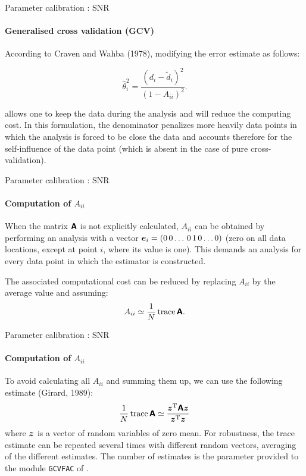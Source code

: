 \begin{frame}{Parameter calibration : SNR}
\framesubtitle{Generalised cross validation (GCV)}

According to Craven and Wahba (1978), modifying the error estimate as follows:

\begin{equation}
{\hat{\theta}_i^2} =  \frac{(d_i - \tilde{d}_i)^2}{(1 - A_{ii})^2}.
\label{eq:misfitestimate}
\end{equation}

allows one to keep the data during the analysis and will reduce the computing cost. In this formulation, the denominator penalizes more heavily data points in which the analysis is forced to be close the data and accounts therefore for the self-influence of the data point (which is absent in the case of pure cross-validation).

\end{frame}


\begin{frame}{Parameter calibration : SNR}
\framesubtitle{Computation of $A_{ii}$}

When the matrix $\mbox{\boldmath $ \protect\mathsf{A} $}$ is not explicitly calculated, $A_{ii}$ can be obtained by performing an analysis with a vector $\mbox{\boldmath $ e $}_i=(0\,0\ldots\,0\,1\,0\ldots 0)$ (zero on all data locations, except at point $i$, where its value is one). This demands an analysis for every data point in which the estimator is constructed.  

The associated computational cost can be reduced by replacing $A_{ii}$ by the average value and assuming:
\begin{equation}
A_{ii} \simeq \frac{1}{N} \operatorname{trace}{\mbox{\boldmath $ \protect\mathsf{A} $}}.
\label{eq:aiitrace}
\end{equation}

\end{frame}


\begin{frame}{Parameter calibration : SNR}
\framesubtitle{Computation of $A_{ii}$}

To avoid calculating all $A_{ii}$ and summing them up, we can use the following estimate (Girard, 1989):
\begin{equation}
\frac{1}{N} \operatorname{trace}{\mbox{\boldmath $ \protect\mathsf{A} $}} \simeq  \frac{ {\mbox{\boldmath $ z $}}^{\protect\mathrm{T}} \mbox{\boldmath $ \protect\mathsf{A} $} \mbox{\boldmath $ z $} }{{\mbox{\boldmath $ z $}}^{\protect\mathrm{T}} \mbox{\boldmath $ z $} }
\label{eq:traceest}
\end{equation}
where $\mbox{\boldmath $ z $}$ is a vector of random variables of zero mean. For robustness, the trace estimate can be repeated several times with different random vectors, averaging of the different estimates. The number of estimates is the parameter provided to the module \texttt{GCVFAC} of \diva.

\end{frame}

